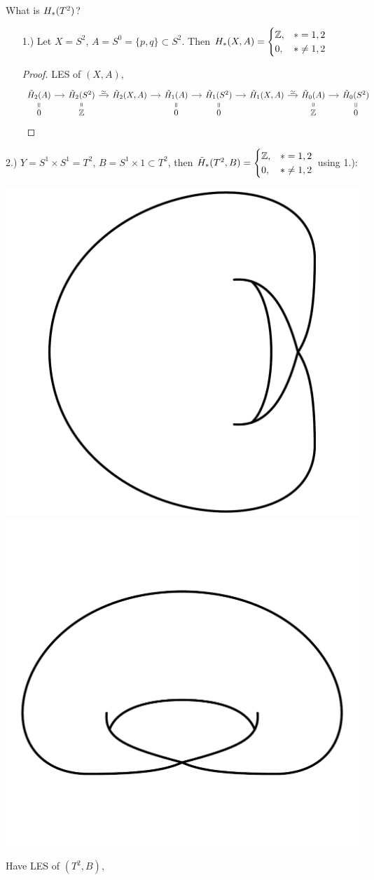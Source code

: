 \documentclass[a4paper,11pt]{article}
\begin{document}
				\begin{eg}
					What is $H_{\ast}(T^2)$?
					\begin{enumerate}
						\item [1.)] Let $X=S^2$, $A=S^0=\{p,q\}\subset S^2$. Then $H_{\ast}(X,A)=\begin{cases}
							\mathbb{Z},& \ast=1,2\\0,& \ast\neq1,2
						\end{cases}$
						\begin{proof}
							LES of $(X,A)$,
							\begin{equation*}
								\begin{tikzcd}[column sep=small,row sep=tiny]
									\rhg[2]{A}\ar[d,equal]\ar[r]& \rhg[2]{S^2}\ar[d,equal]\ar[r,"\simeq"]& \rhg[2]{X,A}\ar[r]& \rhg[1]{A}\ar[d,equal]\ar[r]& \rhg[1]{S^2}\ar[d,equal]\ar[r]& \rhg[1]{X,A}\ar[r,"\simeq"]& \rhg[0]{A}\ar[d,equal]\ar[r]& \rhg[0]{S^2}\ar[d,equal]\\
									0 & \Z & & 0 & 0 & & \Z & 0
								\end{tikzcd}
							\end{equation*}
						\end{proof}
					\end{enumerate}
					\item[2.)] $Y=S^1\times S^1=T^2$, $B=S^1\times 1\subset T^2$, then $\tilde{H}_{\ast}(T^2,B)=\begin{cases}
						\mathbb{Z},&\ast=1,2\\0,&\ast\neq1,2
					\end{cases}$ using 1.):
					\begin{center}
						\includegraphics[width=.2\textwidth]{S2modS0.pdf}\hspace{7em}\includegraphics[width=.2\textwidth]{T2modS1.pdf}
					\end{center}
					Have LES of $(T^2,B)$,
					\begin{equation*}
						\begin{tikzcd}[column sep=small,row sep=tiny]

\end{tikzcd}
\end{equation*}
\end{eg}
\end{document}
